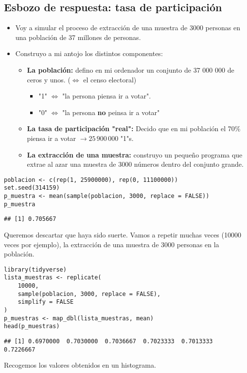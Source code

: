 \subsection{Esbozo de respuesta: tasa de participación}
\begin{tcolorbox}[colback=blue!5!white, colframe=blue!75!black, title=Para convenceros, un experimento de simulación]
\begin{itemize}[label=\textbullet]
    \item Voy a simular el proceso de extracción de una muestra de 3000 personas en una población de 37 millones de personas.
    \item Construyo a mi antojo los distintos componentes:
        \begin{itemize}[label=\textrightarrow]
            \item \textbf{La población:} defino en mi ordenador un conjunto de 37 000 000 de ceros y unos. ($\Leftrightarrow$ el censo electoral)
                \begin{itemize}[label=\textbullet]
                    \item "1" $\Leftrightarrow$ "la persona piensa ir a votar".
                    \item "0" $\Leftrightarrow$ "la persona \textbf{no} peinsa ir a votar"
                \end{itemize}
            \item \textbf{La tasa de participación "real":} Decido que en mi población el 70\% piensa ir a votar $\to 25\,900\,000$ "1"s.
            \item \textbf{La extracción de una muestra:} construyo un pequeño programa que extrae al azar una muestra de 3000 números dentro del conjunto grande. 
        \end{itemize}
\end{itemize}
\end{tcolorbox}
\begin{lstlisting}
poblacion <- c(rep(1, 25900000), rep(0, 11100000))
set.seed(314159)
p_muestra <- mean(sample(poblacion, 3000, replace = FALSE))
p_muestra   
\end{lstlisting}
\begin{verbatim}
## [1] 0.705667    
\end{verbatim}

Queremos descartar que haya sido suerte. Vamos a repetir muchas veces (10000 veces por ejemplo), la extracción de una muestra de 3000 personas en la población.
\begin{lstlisting}
library(tidyverse)
lista_muestras <- replicate(
    10000,
    sample(poblacion, 3000, replace = FALSE),
    simplify = FALSE
)
p_muestras <- map_dbl(lista_muestras, mean)
head(p_muestras)
\end{lstlisting}
\begin{verbatim}
## [1] 0.6970000  0.7030000  0.7036667  0.7023333  0.7013333  0.7226667
\end{verbatim}

Recogemos los valores obtenidos en un histograma.
